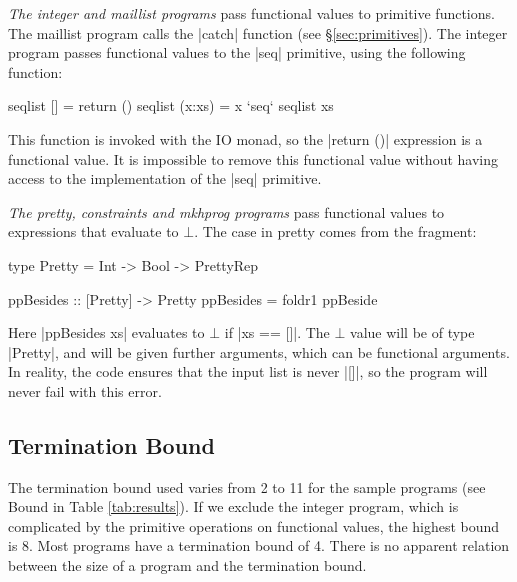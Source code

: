 \documentclass[preprint]{sigplanconf}
\begin{document}
\begin{example}
\textit{The integer and maillist programs} pass functional values to primitive functions. The maillist program calls the |catch| function (see \S\ref{sec:primitives}). The integer program passes functional values to the |seq| primitive, using the following function:

\begin{code}
seqlist []      = return ()
seqlist (x:xs)  = x `seq` seqlist xs
\end{code}

This function is invoked with the IO monad, so the |return ()| expression is a functional value. It is impossible to remove this functional value without having access to the implementation of the |seq| primitive.
\end{example}

\begin{example}
\textit{The pretty, constraints and mkhprog programs} pass functional values to expressions that evaluate to $\bot$. The case in pretty comes from the fragment:

\begin{comment}
\begin{code}
data PrettyRep = PrettyRep
ppBeside :: Pretty -> Pretty -> Pretty
\end{code}
\end{comment}
\begin{code}
type Pretty = Int -> Bool -> PrettyRep

ppBesides :: [Pretty] -> Pretty
ppBesides = foldr1 ppBeside
\end{code}

Here |ppBesides xs| evaluates to $\bot$ if |xs == []|. The $\bot$ value will be of type |Pretty|, and will be given further arguments, which can be functional arguments. In reality, the code ensures that the input list is never |[]|, so the program will never fail with this error.
\end{example}

\subsection{Termination Bound}

The termination bound used varies from 2 to 11 for the sample programs (see Bound in Table \ref{tab:results}). If we exclude the integer program, which is complicated by the primitive operations on functional values, the highest bound is 8. Most programs have a termination bound of 4. There is no apparent relation between the size of a program and the termination bound.
\end{document}
